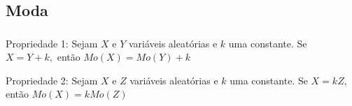 \documentclass[14pt,aspectratio=1610]{beamer}
\begin{document}
\subsection{Moda}
\begin{frame}{}
\frametitle{}
\begin{block}{Propriedade 1:}
\justifying
Sejam $X$ e $Y$ variáveis aleatórias e $k$ uma constante. Se $X=Y+k,$ então $Mo(X)=Mo(Y)+k$
\end{block}
\pause
\begin{block}{Propriedade 2:}
\justifying
Sejam $X$ e $Z$ variáveis aleatórias e $k$ uma constante. Se $X=kZ,$ então $Mo(X)=kMo(Z)$
\nocite{Morettin09, Apostila, eric, montgomery2016, Bastos2025}
\end{block}
\end{frame}



\begin{frame}[allowframebreaks]
\frametitle{}
\printbibliography
\end{frame}
\end{document}
